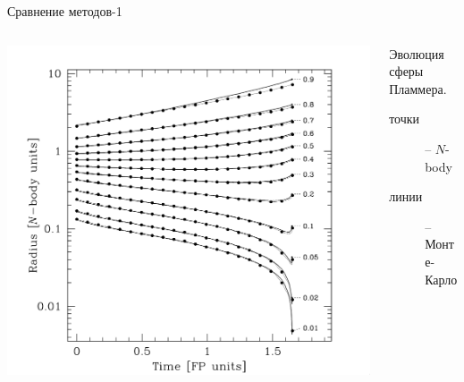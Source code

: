 \documentclass{beamer}
\begin{document}
    \begin{frame}{Сравнение методов-1}
      \begin{columns}
        \begin{column}{0.6\textwidth}
          \includegraphics[width=\textwidth]{img/methodcomp}
        \end{column}
        \begin{column}{0.4\textwidth}
          \footnotesize
          Эволюция сферы Пламмера.
          \begin{description}
            \item[точки] -- $N$-body 
            \item[линии] -- Монте-Карло 
          \end{description}
          
        \end{column}
      \end{columns}
    \end{frame}
\end{document}
